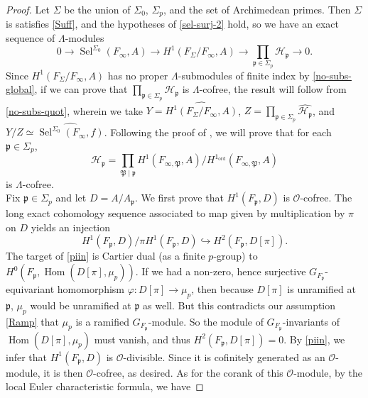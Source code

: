 \documentclass[12 pt]{amsart}
\theoremstyle{plain}
\theoremstyle{definition}
\numberwithin{equation}{section}
\numberwithin{table}{section}
\begin{document}
\begin{proof}
Let $\Sigma$ be the union of $\Sigma_0$, $\Sigma_p$, and the set of Archimedean primes. Then $\Sigma$ is satisfies \cref{Suff}, and the hypotheses of \cref{sel-surj-2} hold, so we have an exact sequence of $\Lambda$-modules
\begin{equation*}
0\rightarrow\operatorname{Sel}^{\Sigma_0}(F_\infty,A)\rightarrow H^1(F_\Sigma/F_\infty,A)\rightarrow\prod_{\mathfrak{p}\in\Sigma_p}\mathcal{H}_\mathfrak{p}\rightarrow 0\text{.}
\end{equation*}
Since $H^1(F_\Sigma/F_\infty,A)$ has no proper $\Lambda$-submodules of finite index by \cref{no-subs-global}, if we can prove that $\prod_{\mathfrak{p}\in\Sigma_p}\mathcal{H}_\mathfrak{p}$ is $\Lambda$-cofree, the result will follow from \cref{no-subs-quot}, wherein we take $Y=\widehat{H^1(F_\Sigma/F_\infty,A)}$, $Z=\prod_{\mathfrak{p}\in\Sigma_p}\widehat{\mathcal{H}_\mathfrak{p}}$, and $Y/Z\simeq\widehat{\operatorname{Sel}^{\Sigma_0}(F_\infty,f)}$. Following the proof of \cite[Proposition 2.5]{GV00}, we will prove that for each $\mathfrak{p}\in\Sigma_p$,
\begin{equation*}
\mathcal{H}_\mathfrak{p}=\prod_{\mathfrak{P}\mid\mathfrak{p}}H^1(F_{\infty,\mathfrak{P}},A)/H^1_\operatorname{ord}(F_{\infty,\mathfrak{P}},A)
\end{equation*}
is $\Lambda$-cofree.\\%
\indent Fix $\mathfrak{p}\in\Sigma_p$ and let $D=A/A_\mathfrak{p}$. We first prove that $H^1(F_\mathfrak{p},D)$ is $\mathscr{O}$-cofree. The long exact cohomology sequence associated to map given by multiplication by $\pi$ on $D$ yields an injection
\begin{equation}
\label{piin}
H^1(F_\mathfrak{p},D)/\pi H^1(F_\mathfrak{p},D)\hookrightarrow H^2(F_\mathfrak{p},D[\pi])\text{.}
\end{equation}
The target of \cref{piin} is Cartier dual (as a finite $p$-group) to $H^0(F_\mathfrak{p},\operatorname{Hom}(D[\pi],\mu_p))$. If we had a non-zero, hence surjective $G_{F_\mathfrak{p}}$-equivariant homomorphism $\varphi:D[\pi]\rightarrow \mu_p$, then because $D[\pi]$ is unramified at $\mathfrak{p}$, $\mu_p$ would be unramified at $\mathfrak{p}$ as well. But this contradicts our assumption \cref{Ramp} that $\mu_p$ is a ramified $G_{F_\mathfrak{p}}$-module. So the module of $G_{F_\mathfrak{p}}$-invariants of $\operatorname{Hom}(D[\pi],\mu_p)$ must vanish, and thus $H^2(F_\mathfrak{p},D[\pi])=0$. By \cref{piin}, we infer that $H^1(F_\mathfrak{p},D)$ is $\mathscr{O}$-divisible. Since it is cofinitely generated as an $\mathscr{O}$-module, it is then $\mathscr{O}$-cofree, as desired. As for the corank of this $\mathscr{O}$-module, by the local Euler characteristic formula, we have

\end{proof}
\end{document}
